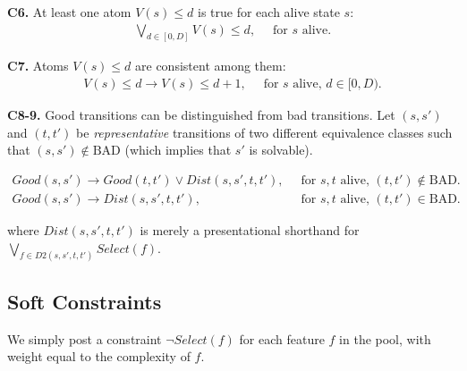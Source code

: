 \documentclass[a4paper]{article}
\newcommand{\smallpar}[1]{{\vspace{10pt}\noindent \bf #1.}}
\newcommand{\badtx}{\ensuremath{\mathrm{BAD}}}
\begin{document}
\smallpar{C6}
At least one atom $V(s) \leq d$ is true for each alive state $s$:
\begin{align}
 \bigvee_{d \in [0, D]} V(s) \leq d,&\;\; \text{for $s$ alive.}
\end{align}

\smallpar{C7}
Atoms $V(s) \leq d$ are consistent among them:
\begin{align}
 V(s) \leq d \rightarrow V(s) \leq d+1,&\;\; \text{for $s$ alive, $d \in [0, D)$.}
\end{align}

\smallpar{C8-9}
Good transitions can be distinguished from bad transitions.
Let $(s, s')$ and $(t, t')$ be \emph{representative} transitions
of two different equivalence classes such that $(s, s') \not\in \badtx$
(which implies that $s'$ is solvable).

\begin{align}
 Good(s, s') \rightarrow Good(t, t') \lor
 Dist(s, s', t, t'),&\;\; \text{for $s, t$ alive, $(t, t') \not\in \badtx$.} \\
 Good(s, s') \rightarrow
 Dist(s, s', t, t'),&\;\; \text{for $s, t$ alive, $(t, t') \in \badtx$.}
\end{align}


\noindent where $Dist(s, s', t, t')$ is merely a presentational shorthand for $\bigvee_{f \in D2(s, s', t, t')} Select(f)$.




\subsection{Soft Constraints}
We simply post a constraint $\neg Select(f)$ for each feature $f$ in the pool, with weight equal to the complexity of $f$.



\end{document}
